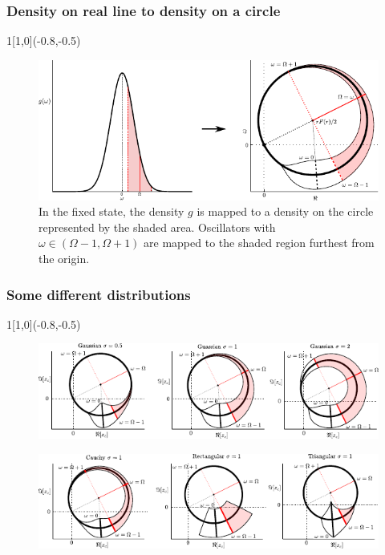 \documentclass[10pt,reqno]{beamer}
\begin{document}
\begin{frame}
\frametitle{Density on real line to density on a circle}
\begin{textblock}{1}[1,0](-0.8,-0.5)
\end{textblock}

\begin{figure}
\includegraphics[scale=0.95]{dist}
\caption{In the fixed state, the density $g$ is mapped to a density on the circle represented by the shaded area. 
Oscillators with $\omega \in (\Omega-1, \Omega+1)$ are mapped to the shaded region furthest from the origin.}
\end{figure}
\end{frame}
\begin{frame}
\frametitle{Some different distributions}
\begin{textblock}{1}[1,0](-0.8,-0.5)
\end{textblock}

\begin{figure}
\includegraphics{gaussiancomp}
\end{figure}

\begin{figure}
\includegraphics{distcomp}
\end{figure}


\end{frame}
\end{document}
